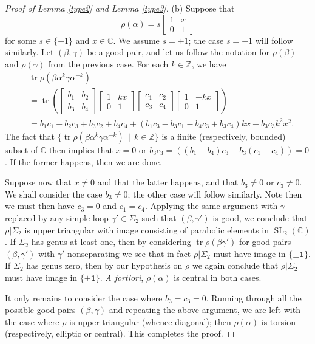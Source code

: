 \documentclass[reqno]{amsart}
\theoremstyle{plain}
\theoremstyle{definition}
\theoremstyle{remark}
\newcommand{\C}{{\mathbb{C}}}
\newcommand{\Z}{{\mathbb{Z}}}
\DeclareMathOperator{\SL}{SL}
\DeclareMathOperator{\tr}{tr}
\begin{document}
\begin{proof}[Proof of Lemma \ref{type2} and Lemma \ref{type3}]
(b) Suppose that
	$$\rho(\alpha)=s\begin{bmatrix}1 & x \\ 0 &1\end{bmatrix}$$
	for some $s\in\{\pm1\}$ and $x\in\C$. We assume $s=+1$; the case $s=-1$ will follow similarly. Let $(\beta,\gamma)$ be a good pair, and let us follow the notation for $\rho(\beta)$ and $\rho(\gamma)$ from the previous case. For each $k\in\Z$, we have
	\begin{align*}&\tr\rho(\beta\alpha^k\gamma\alpha^{-k})\\
	&=\tr\left(\begin{bmatrix}b_1 & b_2\\ b_3 & b_4\end{bmatrix}\begin{bmatrix}1 &kx \\ 0 & 1\end{bmatrix}\begin{bmatrix}c_1 & c_2\\ c_3 & c_4\end{bmatrix}\begin{bmatrix}1 &-kx \\ 0 & 1\end{bmatrix}\right)\\
	&=b_1c_1+b_2c_3+b_3c_2+b_4c_4+(b_1c_3-b_3c_1-b_4c_3+b_3c_4)kx-b_3c_3k^2x^2.
	\end{align*}
	The fact that $\{\tr\rho(\beta\alpha^k\gamma\alpha^{-k})\,\mid\,k\in\Z\}$ is a finite (respectively, bounded) subset of $\C$ then implies that $x=0$ or $b_3c_3=((b_1-b_4)c_3-b_3(c_1-c_4))=0$. If the former happens, then we are done.
	
	Suppose now that $x\neq0$ and that the latter happens, and that $b_3\neq0$ or $c_3\neq0$. We shall consider the case $b_3\neq0$; the other case will follow similarly. Note then we must then have $c_3=0$ and $c_1=c_4$. Applying the same argument with $\gamma$ replaced by any simple loop $\gamma'\in\Sigma_2$ such that $(\beta,\gamma')$ is good, we conclude that $\rho|\Sigma_2$ is upper triangular with image consisting of parabolic elements in $\SL_2(\C)$. If $\Sigma_2$ has genus at least one, then by considering $\tr\rho(\beta\gamma')$ for good pairs $(\beta,\gamma')$ with $\gamma'$ nonseparating we see that in fact $\rho|\Sigma_2$ must have image in $\{\pm\mathbf 1\}$. If $\Sigma_2$ has genus zero, then by our hypothesis on $\rho$ we again conclude that $\rho|\Sigma_2$ must have image in $\{\pm\mathbf 1\}$. \emph{A fortiori}, $\rho(\alpha)$ is central in both cases.
		
	It only remains to consider the case where $b_3=c_3=0$. Running through all the possible good pairs $(\beta,\gamma)$ and repeating the above argument, we are left with the case where $\rho$ is upper triangular (whence diagonal); then $\rho(\alpha)$ is torsion (respectively, elliptic or central). This completes the proof.
\end{proof}
 
\end{document}
